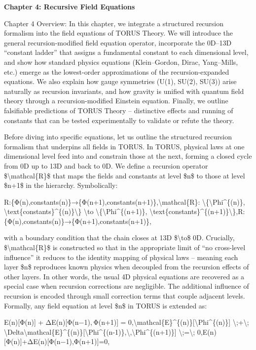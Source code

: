 \documentclass[
]{article}
\author{}
\date{}
\begin{document}
\textbf{Chapter 4: Recursive Field Equations}

Chapter 4 Overview: In this chapter, we integrate a structured recursion
formalism into the field equations of TORUS Theory. We will introduce
the general recursion-modified field equation operator, incorporate the
0D--13D ``constant ladder'' that assigns a fundamental constant to each
dimensional level, and show how standard physics equations
(Klein--Gordon, Dirac, Yang--Mills, etc.) emerge as the lowest-order
approximations of the recursion-expanded equations. We also explain how
gauge symmetries (U(1), SU(2), SU(3)) arise naturally as recursion
invariants, and how gravity is unified with quantum field theory through
a recursion-modified Einstein equation. Finally, we outline falsifiable
predictions of TORUS Theory -- distinctive effects and running of
constants that can be tested experimentally to validate or refute the
theory.

Before diving into specific equations, let us outline the structured
recursion formalism that underpins all fields in TORUS. In TORUS,
physical laws at one dimensional level feed into and constrain those at
the next, forming a closed cycle from 0D up to 13D and back to 0D. We
define a recursion operator \$\textbackslash mathcal\{R\}\$ that maps
the fields and constants at level \$n\$ to those at level \$n+1\$ in the
hierarchy. Symbolically:

R:\{Φ(n),constants(n)\}→\{Φ(n+1),constants(n+1)\},\textbackslash mathcal\{R\}:
\textbackslash\{\textbackslash Phi\^{}\{(n)\},
\textbackslash text\{constants\}\^{}\{(n)\}\textbackslash\}
\textbackslash to \textbackslash\{\textbackslash Phi\^{}\{(n+1)\},
\textbackslash text\{constants\}\^{}\{(n+1)\}\textbackslash\},R:\{Φ(n),constants(n)\}→\{Φ(n+1),constants(n+1)\},

with a boundary condition that the chain closes at 13D
\$\textbackslash to\$ 0D. Crucially, \$\textbackslash mathcal\{R\}\$ is
constructed so that in the appropriate limit of ``no cross-level
influence'' it reduces to the identity mapping of physical laws --
meaning each layer \$n\$ reproduces known physics when decoupled from
the recursion effects of other layers. In other words, the usual 4D
physical equations are recovered as a special case when recursion
corrections are negligible. The additional influence of recursion is
encoded through small correction terms that couple adjacent levels.
Formally, any field equation at level \$n\$ in TORUS is extended as:

E(n){[}Φ(n){]}  +  ΔE(n){[}Φ(n−1), Φ(n+1){]}  =  0,\textbackslash mathcal\{E\}\^{}\{(n)\}{[}\textbackslash Phi\^{}\{(n)\}{]}
\textbackslash;+\textbackslash;
\textbackslash Delta\textbackslash mathcal\{E\}\^{}\{(n)\}{[}\textbackslash Phi\^{}\{(n-1)\},\textbackslash,\textbackslash Phi\^{}\{(n+1)\}{]}
\textbackslash;=\textbackslash;
0,E(n){[}Φ(n){]}+ΔE(n){[}Φ(n−1),Φ(n+1){]}=0,
\end{document}
